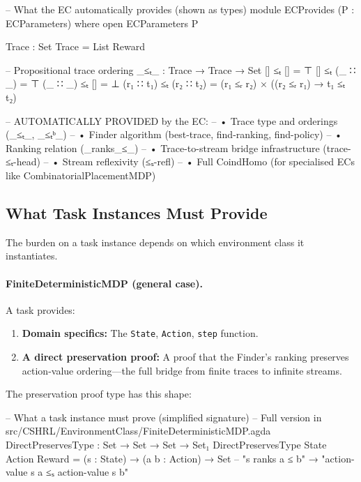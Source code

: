 \documentclass[9pt,a4paper]{article}
\theoremstyle{plain}
\theoremstyle{definition}
\theoremstyle{remark}
\begin{document}
\begin{code}[hide]
  -- What the EC automatically provides (shown as types)
  module ECProvides (P : ECParameters) where
    open ECParameters P
    
    Trace : Set
    Trace = List Reward
    
    -- Propositional trace ordering
    _≤ₜ_ : Trace → Trace → Set
    []       ≤ₜ []       = ⊤
    []       ≤ₜ (_ ∷ _)  = ⊤
    (_ ∷ _)  ≤ₜ []       = ⊥
    (r₁ ∷ t₁) ≤ₜ (r₂ ∷ t₂) = (r₁ ≤ᵣ r₂) × ((r₂ ≤ᵣ r₁) → t₁ ≤ₜ t₂)
\end{code}

\begin{code}
  -- AUTOMATICALLY PROVIDED by the EC:
  -- • Trace type and orderings (_≤ₜ_, _≤ₜᵇ_)
  -- • Finder algorithm (best-trace, find-ranking, find-policy)
  -- • Ranking relation (_ranks_≤_)
  -- • Trace-to-stream bridge infrastructure (trace-≤ₜ-head)
  -- • Stream reflexivity (≤ₛ-refl)
  -- • Full CoindHomo (for specialised ECs like CombinatorialPlacementMDP)
\end{code}

\subsection{What Task Instances Must Provide}\label{sec:task-provide}

The burden on a task instance depends on which environment class it instantiates.

\paragraph{FiniteDeterministicMDP (general case).}
A task provides:
\begin{enumerate}
\item \textbf{Domain specifics:} The \texttt{State}, \texttt{Action}, \texttt{step} function.
\item \textbf{A direct preservation proof:} A proof that the Finder's ranking preserves action-value ordering---the full bridge from finite traces to infinite streams.
\end{enumerate}

\noindent The preservation proof type has this shape:

\begin{code}
  -- What a task instance must prove (simplified signature)
  -- Full version in src/CSHRL/EnvironmentClass/FiniteDeterministicMDP.agda
  DirectPreservesType : Set → Set → Set → Set₁
  DirectPreservesType State Action Reward = 
    (s : State) → (a b : Action) → 
    Set  -- "s ranks a ≤ b" → "action-value s a ≤ₛ action-value s b"
\end{code}
\end{document}
